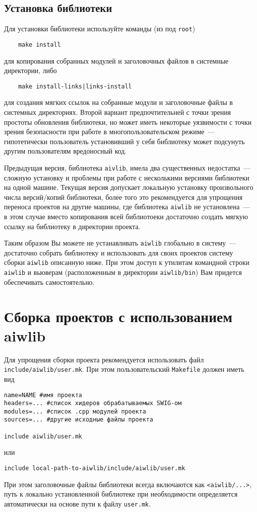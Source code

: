 \subsection{Установка библиотеки}
Для установки библиотеки используйте команды (из под \verb'root')
\begin{verbatim}
    make install
\end{verbatim}
для копирования собранных модулей и заголовочных файлов в системные директории, либо
\begin{verbatim}
    make install-links|links-install
\end{verbatim}
для создания мягких ссылок на собранные модули и заголовочные файлы в системных директориях.
Второй вариант предпочтительней с точки зрения простоты обновления библиотеки, 
но может иметь некоторые уязвимости с точки зрения безопасности
при работе в многопользовательском режиме~--- 
гипотетически пользователь установивший у себя библиотеку может подсунуть другим пользователям вредоносный код.

Предыдущая версия, библиотека {\tt aivlib}, имела два существенных недостатка~--- сложную установку и проблемы при
работе с несколькими версиями библиотеки на одной машине. Текущая версия допускает локальную установку
произвольного числа версий/копий библиотеки, более того это рекомендуется для  
упрощения переноса проектов на другие машины, где библиотека \verb'aiwlib' не установлена~---
в этом случае вместо копирования всей библиотоеки достаточно создать мягкую ссылку на библиотеку в директории проекта.

Таким образом Вы можете не устанавливать \verb'aiwlib' глобально в
систему~--- достаточно собрать библиотеку и использовать для своих
проектов систему сборки \verb'aiwlib' описанную ниже. При этом доступ
к утилитам командной строки \verb'aiwlib' и вьюверам (расположенным в директории
\verb'aiwlib/bin') Вам придется обеспечивать самостоятельно.  

\section{Сборка проектов с использованием aiwlib}
Для упрощения сборки проекта рекомендуется использовать файл \verb'include/aiwlib/user.mk'.
При этом пользовательский \verb'Makefile' должен иметь вид
\begin{verbatim}
name=NAME #имя проекта
headers=... #список хидеров обрабатываемых SWIG-ом
modules=... #список .cpp модулей проекта
sources=... #другие исходные файлы проекта

include aiwlib/user.mk
\end{verbatim}
или
\begin{verbatim}
include local-path-to-aiwlib/include/aiwlib/user.mk
\end{verbatim}
При этом заголовочные файлы библиотеки всегда включаются как \verb'<aiwlib/...>',
путь к локально установленной библиотеке при необходимости определяется автоматически на основе пути к файлу \verb'user.mk'.

